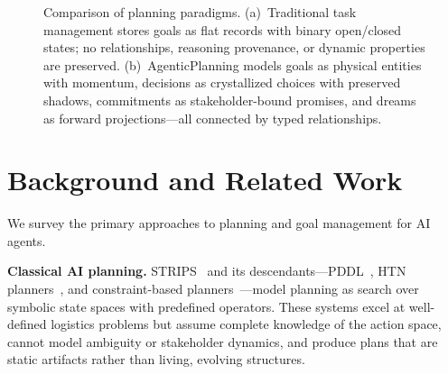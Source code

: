 \documentclass[10pt, twocolumn]{article}
\begin{document}
\begin{figure}[t]
\caption{Comparison of planning paradigms. (a)~Traditional task management stores goals as flat records with binary open/closed states; no relationships, reasoning provenance, or dynamic properties are preserved. (b)~AgenticPlanning models goals as physical entities with momentum, decisions as crystallized choices with preserved shadows, commitments as stakeholder-bound promises, and dreams as forward projections---all connected by typed relationships.}
\label{fig:comparison}
\end{figure}


\section{Background and Related Work}
\label{sec:related}

We survey the primary approaches to planning and goal management for AI agents.

\textbf{Classical AI planning.} STRIPS~\cite{fikes1971strips} and its descendants---PDDL~\cite{mcdermott1998pddl}, HTN planners~\cite{nau2003shop2}, and constraint-based planners~\cite{ghallab2004automated}---model planning as search over symbolic state spaces with predefined operators. These systems excel at well-defined logistics problems but assume complete knowledge of the action space, cannot model ambiguity or stakeholder dynamics, and produce plans that are static artifacts rather than living, evolving structures.
\end{document}
